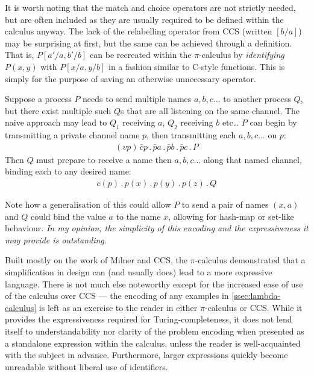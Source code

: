     It is worth noting that the match and choice operators are not strictly needed, but are often included as they are usually required to be defined within the calculus anyway.
    The lack of the relabelling operator from CCS (written $[b/a]$) may be surprising at first, but the same can be achieved through a definition.
    That is, $P[a'/a, b'/b]$ can be recreated within the $\pi$-calculus by \textit{identifying} $P(x, y)$ with $P[x/a, y/b]$ in a fashion similar to C-style functions.
    This is simply for the purpose of saving an otherwise unnecessary operator.




    \begin{example*}
        Suppose a process $P$ needs to send multiple names $a, b, c \ldots$ to another process $Q$, but there exist multiple such $Q$s that are all listening on the same channel.
        The naive approach may lead to $Q_1$ receiving $a$, $Q_2$ receiving $b$ etc\ldots
        $P$ can begin by transmitting a private channel name $p$, then transmitting each $a, b, c \ldots$ on $p$:
        \begin{align*}
            (vp) \, \bar{c} p \, . \, \bar{p} a \, . \, \bar{p} b \, . \, \bar{p} c \, . \, P
        \end{align*}
        Then $Q$ must prepare to receive a name then $a, b, c \ldots$ along that named channel, binding each to any desired name:
        \begin{align*}
            c(p) \, . \, p(x) \, . \, p(y) \, . \, p(z) \, . \, Q
        \end{align*}
    \end{example*}
    Note how a generalisation of this could allow $P$ to send a pair of names $(x, a)$ and $Q$ could bind the value $a$ to the name $x$, allowing for hash-map or set-like behaviour.
    \textit{In my opinion, the simplicity of this encoding and the expressiveness it may provide is outstanding.}


    \begin{remarks}
        Built mostly on the work of Milner and CCS, the $\pi$-calculus demonstrated that a simplification in design can (and usually does) lead to a more expressive language.
        There is not much else noteworthy except for the increased ease of use of the calculus over CCS --- the encoding of any examples in \ref{ssec:lambda-calculus} is left as an exercise to the reader in either $\pi$-calculus or CCS.
        While it provides the expressiveness required for Turing-completeness, it does not lend itself to understandability nor clarity of the problem encoding when presented as a standalone expression within the calculus, unless the reader is well-acquainted with the subject in advance.
        Furthermore, larger expressions quickly become unreadable without liberal use of identifiers.
    \end{remarks}
